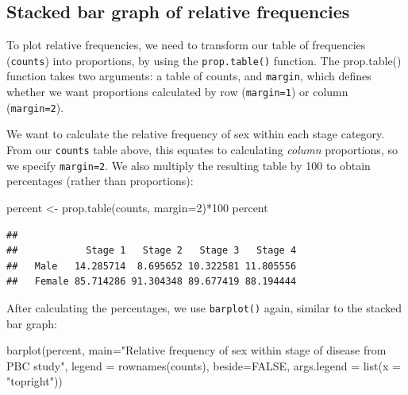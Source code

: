 \documentclass[
]{memoir}
\newenvironment{Shaded}{\begin{snugshade}}{\end{snugshade}}
\newcommand{\AttributeTok}[1]{\textcolor[rgb]{0.77,0.63,0.00}{#1}}
\newcommand{\ConstantTok}[1]{\textcolor[rgb]{0.00,0.00,0.00}{#1}}
\newcommand{\DecValTok}[1]{\textcolor[rgb]{0.00,0.00,0.81}{#1}}
\newcommand{\FunctionTok}[1]{\textcolor[rgb]{0.00,0.00,0.00}{#1}}
\newcommand{\NormalTok}[1]{#1}
\newcommand{\OtherTok}[1]{\textcolor[rgb]{0.56,0.35,0.01}{#1}}
\newcommand{\SpecialCharTok}[1]{\textcolor[rgb]{0.00,0.00,0.00}{#1}}
\newcommand{\StringTok}[1]{\textcolor[rgb]{0.31,0.60,0.02}{#1}}
\begin{document}
\hypertarget{stacked-bar-graph-of-relative-frequencies}{%
\subsection{Stacked bar graph of relative frequencies}\label{stacked-bar-graph-of-relative-frequencies}}

To plot relative frequencies, we need to transform our table of frequencies (\texttt{counts}) into proportions, by using the \texttt{prop.table()} function. The prop.table() function takes two arguments: a table of counts, and \texttt{margin}, which defines whether we want proportions calculated by row (\texttt{margin=1}) or column (\texttt{margin=2}).

We want to calculate the relative frequency of sex within each stage category. From our \texttt{counts} table above, this equates to calculating \emph{column} proportions, so we specify \texttt{margin=2}. We also multiply the resulting table by 100 to obtain percentages (rather than proportions):

\begin{Shaded}
\begin{Highlighting}[]
\NormalTok{percent }\OtherTok{\textless{}{-}} \FunctionTok{prop.table}\NormalTok{(counts, }\AttributeTok{margin=}\DecValTok{2}\NormalTok{)}\SpecialCharTok{*}\DecValTok{100}
\NormalTok{percent}
\end{Highlighting}
\end{Shaded}

\begin{verbatim}
##         
##            Stage 1   Stage 2   Stage 3   Stage 4
##   Male   14.285714  8.695652 10.322581 11.805556
##   Female 85.714286 91.304348 89.677419 88.194444
\end{verbatim}

After calculating the percentages, we use \texttt{barplot()} again, similar to the stacked bar graph:

\begin{Shaded}
\begin{Highlighting}[]
\FunctionTok{barplot}\NormalTok{(percent, }
        \AttributeTok{main=}\StringTok{"Relative frequency of sex within stage of disease from PBC study"}\NormalTok{,}
        \AttributeTok{legend =} \FunctionTok{rownames}\NormalTok{(counts), }\AttributeTok{beside=}\ConstantTok{FALSE}\NormalTok{, }\AttributeTok{args.legend =} \FunctionTok{list}\NormalTok{(}\AttributeTok{x =} \StringTok{"topright"}\NormalTok{))}
\end{Highlighting}
\end{Shaded}
\end{document}
